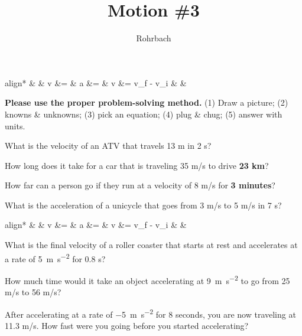 \documentclass[12pt]{exam}
\title{Motion \#3}
\author{Rohrbach}
\newcommand{\printeqs}{
  \begin{center}
    \vspace{-1cm}
    \begin{empheq}[box=\fbox]{align*}
     &
     & 
      v &= \frac{d}{t}        &    
      a &= \frac{\Delta v}{t} &
      \Delta v &= v_f - v_i   &
     &
    \end{empheq}
  \end{center}
}
\begin{document}
\maketitle

\printeqs

\noindent
{\bf Please use the proper problem-solving method.}  (1) Draw a picture; (2) knowns \& unknowns; (3) pick an equation; (4) plug \& chug; (5) answer with units.


\begin{questions}

\question
  What is the velocity of an ATV that travels 13 m in 2 s?
  \vs

\question
  How long does it take for a car that is traveling 
  35 m/s to drive {\bf 23 km}?
  \vs

\question
  How far can a person go if they run at a velocity of 
  8 m/s for {\bf 3 minutes}?
  \vs

\question
  What is the acceleration of a unicycle that goes from 
  3 m/s to 5 m/s in 7 s?
  \vs

\pagebreak

\printeqs


\question
  What is the final velocity of a roller coaster 
  that starts at rest and accelerates at a rate of 
  \SI{5}{\meter\per\second^2} for 0.8 s?
  \vs


\question
  How much time would it take an object accelerating 
  at \SI{9}{\meter\per\second^2} to go from 25 m/s to 56 m/s?
  \vs


\question
  After accelerating at a rate of \SI{-5}{\meter\per\second^2}
  for 8 seconds, you are now traveling at 11.3 m/s.  How fast 
  were you going before you started accelerating?
  \vs



  
\end{questions}
\end{document}
